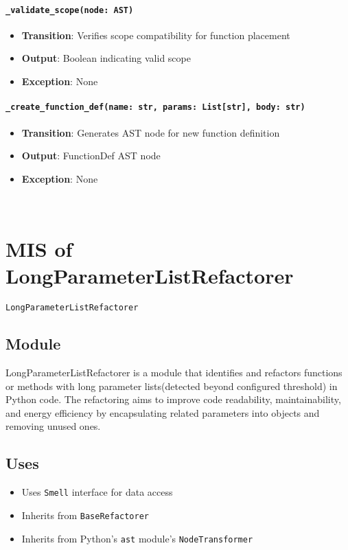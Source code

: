 \documentclass[12pt, titlepage]{article}
\begin{document}
\paragraph{\texttt{\_validate\_scope(node: AST)}}
\begin{itemize}
  \item \textbf{Transition}: Verifies scope compatibility for function placement
  \item \textbf{Output}: Boolean indicating valid scope
  \item \textbf{Exception}: None
\end{itemize}

\paragraph{\texttt{\_create\_function\_def(name: str, params: List[str], body: str)}}
\begin{itemize}
  \item \textbf{Transition}: Generates AST node for new function definition
  \item \textbf{Output}: FunctionDef AST node
  \item \textbf{Exception}: None
\end{itemize}

~\newpage

\section{MIS of LongParameterListRefactorer} \label{Module} 

\texttt{LongParameterListRefactorer}

\subsection{Module}

LongParameterListRefactorer is a module that identifies and refactors functions or methods with long parameter lists(detected beyond configured threshold) in Python code. The refactoring aims to improve code readability, maintainability, and energy efficiency by encapsulating related parameters into objects and removing unused ones.

\subsection{Uses}

\begin{itemize}
  \item Uses \texttt{Smell} interface for data access
  \item Inherits from \texttt{BaseRefactorer}
  \item Inherits from Python's \texttt{ast} module's \texttt{NodeTransformer}
\end{itemize}
\end{document}
